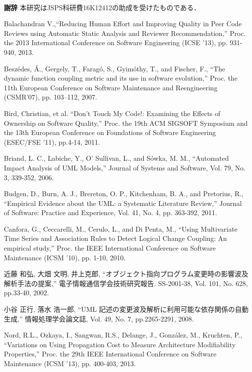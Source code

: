 \documentclass{fose2016}           %
\begin{document}
\noindent \\
{\bf 謝辞} 本研究はJSPS科研費16K12412の助成を受けたものである．

\begin{thebibliography}{10}
Balachandran V.,``Reducing Human Effort and Improving Quality in Peer Code Reviews using Automatic Static Analysis and Reviewer Recommendation,'' Proc. the 2013 International Conference on Software Engineering (ICSE '13), pp. 931-940, 2013.

Besz\'edes, \'A., Gergely, T., Farag\'o, S., Gyim\'othy, T., and Fischer, F.,
``The  dynamic  function  coupling  metric  and  its  use  in  software evolution,'' Proc. the 11th  European  Conference on Software Maintenance and Reengineering (CSMR’07), pp. 103–112, 2007.

Bird, Christian, et al. ``Don't Touch My Code!: Examining the Effects of Ownership on Software Quality,'' Proc. the 19th ACM SIGSOFT Symposium and the 13th European Conference on Foundations of Software Engineering (ESEC/FSE '11), pp.4-14, 2011.

Briand, L. C., Labiche, Y., O' Sullivan, L., and Sówka, M. M., ``Automated Impact Analysis of UML Models,'' Journal of Systems and Software, Vol. 79, No. 3, 339-352, 2006.

Budgen, D., Burn, A. J., Brereton, O. P., Kitchenham, B. A., and Pretorius, R., ``Empirical Evidence about the UML: a Systematic Literature Review,'' Journal of Software: Practice and Experience, Vol. 41, No. 4, pp. 363-392, 2011.

Canfora, G., Ceccarelli, M., Cerulo, L., and Di Penta, M., ``Using Multivariate Time Series and Association Rules to Detect Logical Change Coupling: An empirical study,'' Proc. the IEEE International Conference on Software Maintenance (ICSM '10), pp. 1-10, 2010.

近藤 和弘, 大畑 文明, 井上克郎, ``オブジェクト指向プログラム変更時の影響波及解析手法の提案,'' 電子情報通信学会技術研究報告. SS-2001-38, Vol. 101, No. 628, pp.33-40, 2002.

小谷 正行, 落水 浩一郎, ``UML 記述の変更波及解析に利用可能な依存関係の自動生成,'' 情報処理学会論文誌, Vol. 49, No. 7, pp.2265-2291, 2008.

Nord, R.L., Ozkaya, I., Sangwan, R.S., Delange, J., González, M., Kruchten, P., ``Variations on Using Propagation Cost to Measure Architecture Modifiability Properties,'' Proc. the 29th IEEE International Conference on Software Maintenance (ICSM '13), pp. 400-403, 2013.


\end{thebibliography}
\end{document}
